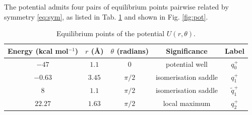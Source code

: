 \documentclass[a4paper]{article}
\begin{document}
The potential admits four pairs of equilibrium points pairwise related by symmetry \eqref{eq:sym}, 
as listed in Tab. \ref{table:equil} and shown in Fig. \ref{fig:pot}.
  
  \begin{table}[ht]
    \begin{center}
    \begin{tabular}{c|c|c|c|c}
    Energy (kcal mol$^{-1}$) & $r$ (\AA) & $\theta$ (radians) & Significance & Label \\
    \hline%
    $-47$ & $1.1$ & $0$ & potential well & $q_0^+$ \\
    $-0.63$ & $3.45$ & $\pi/2$ & isomerisation saddle & $q_1^+$ \\
    $8$ & $1.1$ & $\pi/2$ & isomerisation saddle & $\widetilde{q}_1^+$ \\
    $22.27$ & $1.63$ & $\pi/2$ & local maximum & $q_2^+$ \\
    \end{tabular}
    \end{center}
    \caption{Equilibrium points of the potential $U(r, \theta)$.}
    \label{table:equil}
   \end{table}



\end{document}
